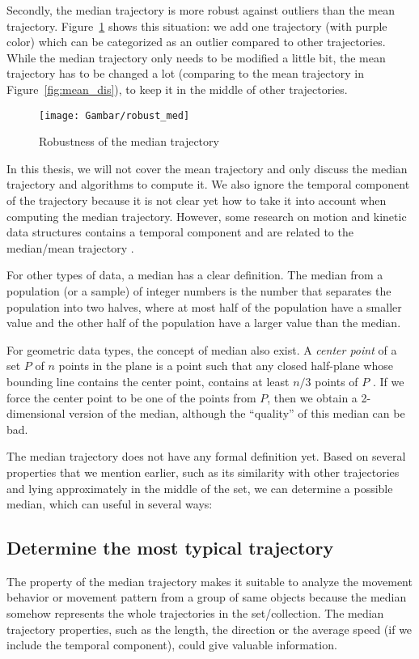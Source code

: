 Secondly, the median trajectory is more robust against outliers than the mean trajectory.
Figure~\ref{fig:robust_med} shows this situation: we add one trajectory (with purple color) which can be categorized as an outlier compared to other trajectories. 
While the median trajectory only needs to be modified a little bit, the mean trajectory has to be changed a lot (comparing to the mean trajectory in Figure~\ref{fig:mean_dis}), to keep it in the middle of other trajectories.

\begin{figure}
\centering
\texttt{[image: Gambar/robust\_med]}
\caption[Robustness of the median trajectory]{Robustness of the median trajectory} 
\label{fig:robust_med}
\end{figure}

In this thesis, we will not cover the mean trajectory and only discuss the median trajectory and algorithms to compute it.
We also ignore the temporal component of the trajectory because it is not clear yet how to take it into account when computing the median trajectory. 
However, some research on motion and kinetic data structures contains a temporal component and are related to the median/mean trajectory \cite{Agarwal:2003,Agarwal:1997}. 

For other types of data, a median has a clear definition.
The median from a population (or a sample) of integer numbers is the number that separates the population into two halves, where at most half of the population have a smaller value and the other half of the population have a larger value than the median. 

For geometric data types, the concept of median also exist.
A \textit{center point} of a set $P$ of $n$ points in the plane is a point such that any closed half-plane whose bounding line contains the center point, contains at least $n/3$ points of $P$ \cite{Amenta:2000}.
If we force the center point to be one of the points from $P$, then we obtain a 2-dimensional version of the median, although the ``quality'' of this median can be bad.

The median trajectory does not have any formal definition yet.
Based on several properties that we mention earlier, such as its similarity with other trajectories and lying approximately in the middle of the set, we can determine a possible median, which can useful in several ways:

\subsection{Determine the most typical trajectory}
The property of the median trajectory makes it suitable to analyze the movement behavior or movement pattern from a group of same objects because the median somehow represents the whole trajectories in the set/collection.
The median trajectory properties, such as the length, the direction or the average speed (if we include the temporal component), could give valuable information.

